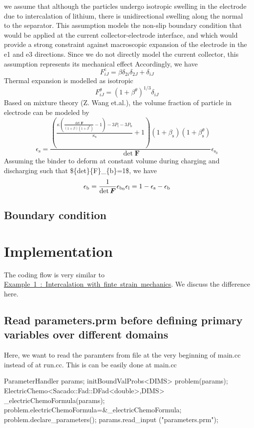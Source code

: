 we assume that although the particles undergo isotropic swelling in the electrode due to intercalation of lithium, there is unidirectional swelling along the normal to the separator. This assumption models the non-\/slip boundary condition that would be applied at the current collector-\/electrode interface, and which would provide a strong constraint against macroscopic expansion of the electrode in the e1 and e3 directions. Since we do not directly model the current collector, this assumption represents its mechanical effect Accordingly, we have \[ F^\text{c}_{iJ}=\beta\delta_{2i}\delta_{2J}+\delta_{iJ} \] Thermal expansion is modelled as isotropic \[ F^{\theta}_{iJ}=(1+\beta^{\theta})^{1/3}\delta_{iJ} \] Based on mixture theory (Z. Wang et.\+al.), the volume fraction of particle in electrode can be modeled by \[ \epsilon_\text{s}=\frac{\left( \frac{\kappa(\frac{\det\boldsymbol{F}}{(1+\beta)(1+\beta^\theta)}-1)-3P_\text{l}-3P_\text{b}}{\kappa_\text{s}} +1\right)(1+\beta_\text{s})(1+\beta_\text{s}^\theta)}{\det\boldsymbol{F}}\epsilon_{\text{s}_0} \] Assuming the binder to deform at constant volume during charging and discharging such that \$\{det\}\{F\}\+\_\+\{b\}=1\$, we have \[ \epsilon_\text{b}=\frac{1}{\det \boldsymbol{F}}\epsilon_{\text{b}_0}\\ \epsilon_\text{l}=1-\epsilon_{\text{s}}-\epsilon_\text{b} \] \hypertarget{battery_electrode_scale_sub2}{}\subsection{Boundary condition}\label{battery_electrode_scale_sub2}
 \hypertarget{battery_particle_Implementation}{}\section{Implementation}\label{battery_particle_Implementation}
The coding flow is very similar to \mbox{\hyperlink{_intercalation}{Example 1 \+: Intercalation with finte strain mechanics}}. We discuss the difference here.\hypertarget{battery_electrode_scale_sub1}{}\subsection{Read parameters.\+prm before defining primary variables over different domains}\label{battery_electrode_scale_sub1}
Here, we want to read the paramters from file at the very beginning of main.\+cc instead of at run.\+cc. This is can be easily done at main.\+cc 
\begin{DoxyCode}
ParameterHandler params;
initBoundValProbs<DIMS> problem(params);
ElectricChemo<Sacado::Fad::DFad<double>,DIMS> \_electricChemoFormula(params);
problem.electricChemoFormula=&\_electricChemoFormula;
problem.declare\_parameters();
params.read\_input (\textcolor{stringliteral}{"parameters.prm"});
\end{DoxyCode}

